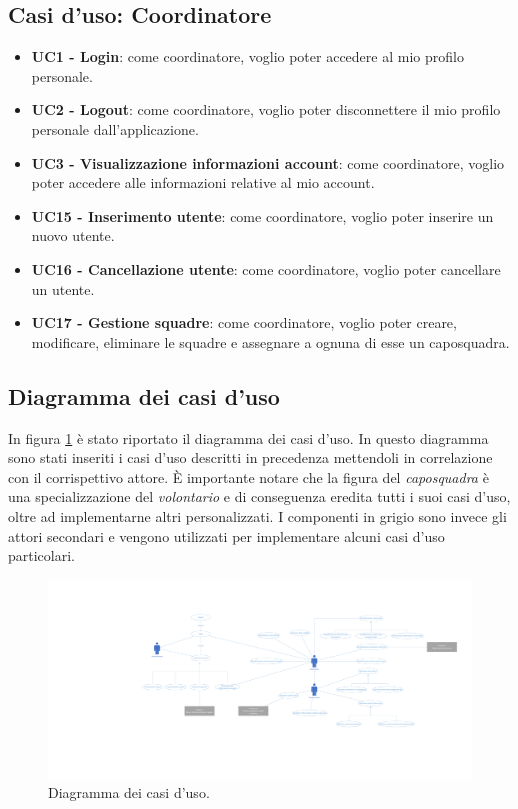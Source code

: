 \subsection{Casi d'uso: Coordinatore}
\begin{itemize}
	\item \textbf{UC1 - Login}:
	come coordinatore, voglio poter accedere al mio profilo personale.
	
	\item \textbf{UC2 - Logout}:
	come coordinatore, voglio poter disconnettere il mio profilo personale dall'applicazione.
	
	\item \textbf{UC3 - Visualizzazione informazioni account}:
	come coordinatore, voglio poter accedere alle informazioni relative al mio account.
	
	\item \textbf{UC15 - Inserimento utente}:
	come coordinatore, voglio poter inserire un nuovo utente.
	
	\item \textbf{UC16 - Cancellazione utente}:
	come coordinatore, voglio poter cancellare un utente.
	
	\item \textbf{UC17 - Gestione squadre}:
	come coordinatore, voglio poter creare, modificare, eliminare le squadre e assegnare a ognuna di esse un caposquadra.
\end{itemize}

\clearpage
\subsection{Diagramma dei casi d'uso}
In figura \ref{fig:UseCaseDiagram} è stato riportato il diagramma dei casi d'uso. In questo diagramma sono stati inseriti i casi d'uso descritti in precedenza mettendoli in correlazione con il corrispettivo attore. È importante notare che la figura del \textit{caposquadra} è una specializzazione del \textit{volontario} e di conseguenza eredita tutti i suoi casi d'uso, oltre ad implementarne altri personalizzati. 
I componenti in grigio sono invece gli attori secondari e vengono utilizzati per implementare alcuni casi d'uso particolari. 
\begin{landscape}
	\begin{figure}[b]
		\centering
		\includegraphics[width=1\linewidth]{./Iterazione 0/OtherFiles/Use cases diagram}
		\caption{Diagramma dei casi d'uso.}
		\label{fig:UseCaseDiagram}
	\end{figure}
\end{landscape}

